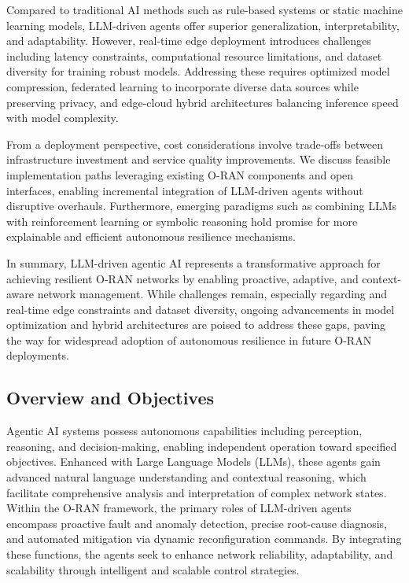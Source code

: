 \documentclass[sigconf]{acmart}
\begin{document}
Compared to traditional AI methods such as rule-based systems or static machine learning models, LLM-driven agents offer superior generalization, interpretability, and adaptability. However, real-time edge deployment introduces challenges including latency constraints, computational resource limitations, and dataset diversity for training robust models. Addressing these requires optimized model compression, federated learning to incorporate diverse data sources while preserving privacy, and edge-cloud hybrid architectures balancing inference speed with model complexity.

From a deployment perspective, cost considerations involve trade-offs between infrastructure investment and service quality improvements. We discuss feasible implementation paths leveraging existing O-RAN components and open interfaces, enabling incremental integration of LLM-driven agents without disruptive overhauls. Furthermore, emerging paradigms such as combining LLMs with reinforcement learning or symbolic reasoning hold promise for more explainable and efficient autonomous resilience mechanisms.

In summary, LLM-driven agentic AI represents a transformative approach for achieving resilient O-RAN networks by enabling proactive, adaptive, and context-aware network management. While challenges remain, especially regarding and real-time edge constraints and dataset diversity, ongoing advancements in model optimization and hybrid architectures are poised to address these gaps, paving the way for widespread adoption of autonomous resilience in future O-RAN deployments.

\subsection{Overview and Objectives}
Agentic AI systems possess autonomous capabilities including perception, reasoning, and decision-making, enabling independent operation toward specified objectives. Enhanced with Large Language Models (LLMs), these agents gain advanced natural language understanding and contextual reasoning, which facilitate comprehensive analysis and interpretation of complex network states. Within the O-RAN framework, the primary roles of LLM-driven agents encompass proactive fault and anomaly detection, precise root-cause diagnosis, and automated mitigation via dynamic reconfiguration commands. By integrating these functions, the agents seek to enhance network reliability, adaptability, and scalability through intelligent and scalable control strategies.
\end{document}

